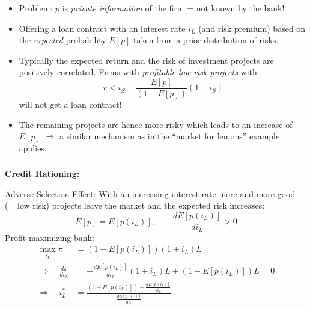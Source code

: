 \documentclass[11pt]{beamer}
\begin{document}

\begin{frame}
\frametitle{\insertsection}

\begin{itemize}
\item Problem: $p$ is \textit{private information} of the firm = not known by the bank!

\item Offering a loan contract with an interest rate $i_L$ (and risk premium) based on the \textit{expected} probability $E[p]$ taken from a prior distribution of risks.

\item Typically the expected return and the risk of investment projects are positively correlated.
Firms with \textit{profitable low risk projects} with
$$
r<i_S+\frac{E[p]}{(1-E[p])}(1+i_S)
$$
will not get a loan contract!

\item The remaining projects are hence more risky which leads to an increase of $E[p]$ $\Rightarrow$ a similar mechanism as in the ``market for lemons'' example applies.
\end{itemize}

\end{frame}


\begin{frame}
\frametitle{\insertsection}

\textbf{Credit Rationing:}
\par\medskip

Adverse Selection Effect: With an increasing interest rate more and more good (= low risk) projects leave the market and the expected risk increases:
$$
E[p]=E[p(i_L)],\qquad \frac{dE[p(i_L)]}{di_L}>0
$$
Profit maximizing bank:
\begin{align}
\max_{i_L} \pi &= (1-E[p(i_L)])(1+i_L)L\\
\Rightarrow\quad
\frac{d\pi}{di_L} &= -\frac{dE[p(i_L)]}{di_L}(1+i_L)L+(1-E[p(i_L)])L=0\\
\Rightarrow\quad
i_L^* &= \frac{(1-E[p(i_L)])-\frac{dE[p(i_L)]}{di_L}}{\frac{dE[p(i_L)]}{di_L}}
\end{align}
\end{frame}

\end{document}
